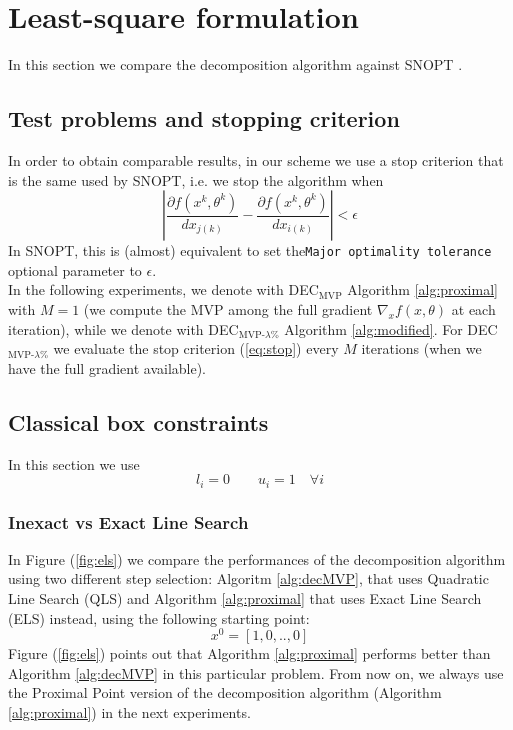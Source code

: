 \section{Least-square formulation}
In this section we compare the decomposition algorithm against SNOPT \cite{snopt}.

\subsection{Test problems and stopping criterion}
In order to obtain comparable results, in our scheme we use a stop criterion that is the same used by SNOPT, i.e. we stop the algorithm when
\begin{equation}\label{eq:stop}
\left| \frac{\partial f(x^k,\theta^k)}{d{x_{j(k)}}} - \frac{\partial f(x^k,\theta^k)}{d{x_{i(k)}} }\right| < \epsilon
\end{equation}
In SNOPT, this is (almost) equivalent to set the\linebreak \texttt{Major optimality tolerance} optional parameter to $\epsilon$.\\
In the following experiments, we denote with DEC$_{\text{MVP}}$ Algorithm \ref{alg:proximal} with $M=1$ (we compute the MVP among the full gradient $\nabla_x f(x,\theta)$ at each iteration), while we denote with DEC$_{\text{MVP-}\lambda\%}$ Algorithm \ref{alg:modified}. For DEC$_{\text{MVP-}\lambda\%}$ we evaluate the stop criterion (\ref{eq:stop}) every $M$ iterations (when we have the full gradient available).

\subsection{Classical box constraints}
In this section we use 
\begin{equation}\label{eq:classicalbox}
l_i = 0  \qquad u_i = 1  \quad \forall i
\end{equation} 
\subsubsection{Inexact vs Exact Line Search}
In Figure (\ref{fig:els}) we compare the performances of the decomposition algorithm using two different step selection: Algoritm \ref{alg:decMVP}, that uses Quadratic Line Search (QLS) and Algorithm \ref{alg:proximal} that uses Exact Line Search (ELS) instead, using the following starting point:
\begin{equation}\label{eq:sparsestarting}
x^0 = \left[1, 0, .., 0 \right]
\end{equation}
Figure (\ref{fig:els}) points out that Algorithm \ref{alg:proximal} performs better than Algorithm \ref{alg:decMVP} in this particular problem. From now on, we always use the Proximal Point version of the decomposition algorithm (Algorithm \ref{alg:proximal}) in the next experiments.

